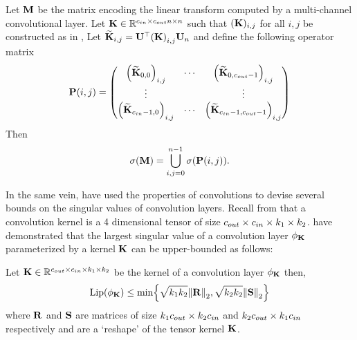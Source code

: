 \begin{theorem} 
  Let $\mathbf{M}$ be the matrix encoding the linear transform computed by a multi-channel convolutional layer.
  Let $\mathbf{K} \in \mathbb{R}^{c_{in} \times c_{out} n \times n}$ such that $(\mathbf{K})_{i,j}$ for all $i,j$ be constructed as in , 
  Let $\widetilde{\Kmat}_{i,j} = \Umat^\top \leftmat \Kmat \rightmat_{i,j} \Umat_n $ and define the following operator matrix 
  \begin{equation}
    \Pmat(i,j) = \leftmatrix 
    \leftmat \widetilde{\Kmat}_{0,0} \rightmat_{i, j} & \cdots & \leftmat \widetilde{\Kmat}_{0, \cout-1} \rightmat_{i, j} \\
    \vdots & & \vdots \\
    \leftmat \widetilde{\Kmat}_{\cin-1, 0} \rightmat_{i, j} & \cdots & \leftmat \widetilde{\Kmat}_{\cin-1, \cout-1} \rightmat_{i, j}
    \rightmatrix
  \end{equation}
  Then
  \begin{equation}
    \sigma(\Mmat) = \bigcup_{i, j = 0}^{n-1} \sigma \left(  \Pmat(i,j) \right).
  \end{equation}
  \removespace
\end{theorem}





In the same vein, \citet{singla2019bounding} have used the properties of convolutions to devise several bounds on the singular values of convolution layers.
Recall from  that a convolution kernel is a 4 dimensional tensor of size $c_{out} \times c_{in} \times k_1 \times k_2$.
\citet{singla2019bounding} have demonstrated that the largest singular value of a convolution layer $\phi_\mathbf{K}$ parameterized by a kernel $\mathbf{K}$ can be upper-bounded as follows:

\begin{theorem}
  Let $\mathbf{K} \in \mathbb{R}^{c_{out} \times c_{in} \times k_1 \times k_2}$ be the kernel of a convolution layer $\phi_\mathbf{K}$ then,  
  \begin{equation}
    \lip{\layer_\Kmat} \leq \min \left\{ \sqrt{k_1 k_2} \norm{\Rmat}_2, \sqrt{k_2 k_2} \norm{\Smat}_2 \right\}
  \end{equation}
  where $\mathbf{R}$ and $\mathbf{S}$ are matrices of size $k_1 c_{out} \times k_2 c_{in}$ and $k_2 c_{out} \times k_1 c_{in}$ respectively and are a `reshape' of the tensor kernel $\mathbf{K}$.
\end{theorem}

